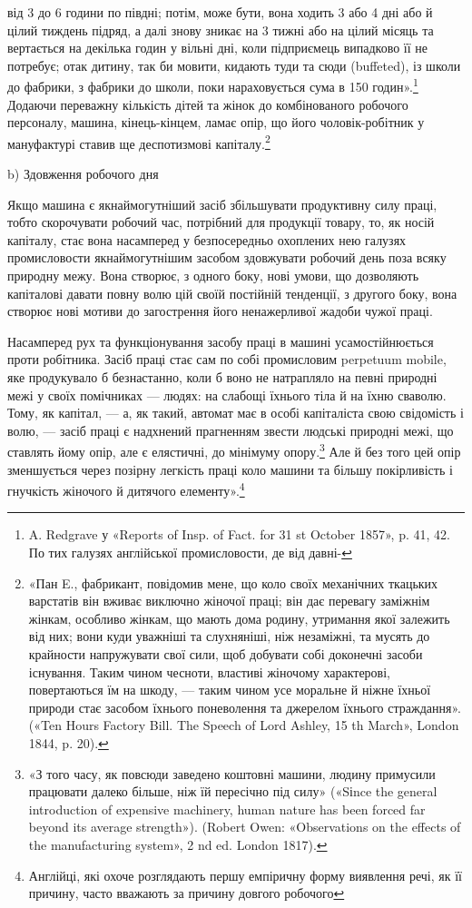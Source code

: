 від 3 до 6 години по півдні; потім, може бути, вона ходить 3 або 4 дні
або й цілий тиждень підряд, а далі знову зникає на 3 тижні або
на цілий місяць та вертається на декілька годин у вільні дні,
коли підприємець випадково її не потребує; отак дитину, так би
мовити, кидають туди та сюди (buffeted), із школи до фабрики,
з фабрики до школи, поки нараховується сума в 150 годин».\footnote{
A. Redgrave у «Reports of Insp. of Fact. for 31 st October
1857», p. 41, 42. По тих галузях англійської промисловости, де від давні-
}
Додаючи переважну кількість дітей та жінок до комбінованого
робочого персоналу, машина, кінець-кінцем, ламає опір, що
його чоловік-робітник у мануфактурі ставив ще деспотизмові
капіталу.\footnote{
«Пан E., фабрикант, повідомив мене, що коло своїх механічних
ткацьких варстатів він вживає виключно жіночої праці; він дає перевагу
заміжнім жінкам, особливо жінкам, що мають дома родину, утримання
якої залежить від них; вони куди уважніші та слухняніші, ніж незаміжні,
та мусять до крайности напружувати свої сили, щоб добувати собі доконечні
засоби існування. Таким чином чесноти, властиві жіночому характерові,
повертаються їм на шкоду, — таким чином усе моральне й ніжне
їхньої природи стає засобом їхнього поневолення та джерелом їхнього
страждання». («Ten Hours Factory Bill. The Speech of Lord Ashley, 15 th
March», London 1844, p. 20).
}

b) Здовження робочого дня

Якщо машина є якнаймогутніший засіб збільшувати продуктивну
силу праці, тобто скорочувати робочий час, потрібний для
продукції товару, то, як носій капіталу, стає вона насамперед
у безпосередньо охоплених нею галузях промисловости якнаймогутнішим
засобом здовжувати робочий день поза всяку природну
межу. Вона створює, з одного боку, нові умови, що дозволяють
капіталові давати повну волю цій своїй постійній тенденції,
з другого боку, вона створює нові мотиви до загострення його
ненажерливої жадоби чужої праці.

Насамперед рух та функціонування засобу праці в машині
усамостійнюється проти робітника. Засіб праці стає сам по собі
промисловим perpetuum mobile, яке продукувало б безнастанно,
коли б воно не натрапляло на певні природні межі у своїх помічниках
— людях: на слабощі їхнього тіла й на їхню сваволю.
Тому, як капітал, — а, як такий, автомат має в особі капіталіста
свою свідомість і волю, — засіб праці є надхнений прагненням
звести людські природні межі, що ставлять йому опір, але є елястичні,
до мінімуму опору.\footnote{
«З того часу, як повсюди заведено коштовні машини, людину
примусили працювати далеко більше, ніж їй пересічно під силу» («Sіnce
the general introduction of expensive machinery, human nature has been
forced far beyond its average strength»). (Robert Owen: «Observations
on the effects of the manufacturing system», 2 nd ed. London 1817).
} Але й без того цей опір зменшується
через позірну легкість праці коло машини та більшу покірливість
і гнучкість жіночого й дитячого елементу».\footnote{
Англійці, які охоче розглядають першу емпіричну форму виявлення
речі, як її причину, часто вважають за причину довгого робочого
}

